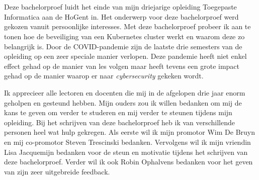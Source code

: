 
\chapter*{}
\label{ch:voorwoord}


Deze bachelorproef luidt het einde van mijn driejarige opleiding Toegepaste Informatica aan de HoGent in. Het onderwerp voor deze bachelorproef werd gekozen vanuit persoonlijke interesses. Met deze bachelorproef probeer ik aan te tonen hoe de beveiliging van een Kubernetes cluster werkt en waarom deze zo belangrijk is. Door de COVID-pandemie zijn de laatste drie semesters van de opleiding op een zeer speciale manier verlopen. Deze pandemie heeft niet enkel effect gehad op de manier van les volgen maar heeft tevens een grote impact gehad op de manier waarop er naar \textit{cybersecurity} gekeken wordt. 

Ik apprecieer alle lectoren en docenten die mij in de afgelopen drie jaar enorm geholpen en gesteund hebben. Mijn ouders zou ik willen bedanken om mij de kans te geven om verder te studeren en mij verder te steunen tijdens mijn opleiding. Bij het schrijven van deze bachelorproef heb ik van verschillende personen heel wat hulp gekregen. Als eerste wil ik mijn promotor Wim De Bruyn en mij co-promotor Steven Trescinski bedanken. Vervolgens wil ik mijn vriendin Lisa Jacquemijn bedanken voor de steun en motivatie tijdens het schrijven van deze bachelorproef.  Verder wil ik ook Robin Ophalvens bedanken voor het geven van zijn zeer uitgebreide feedback.